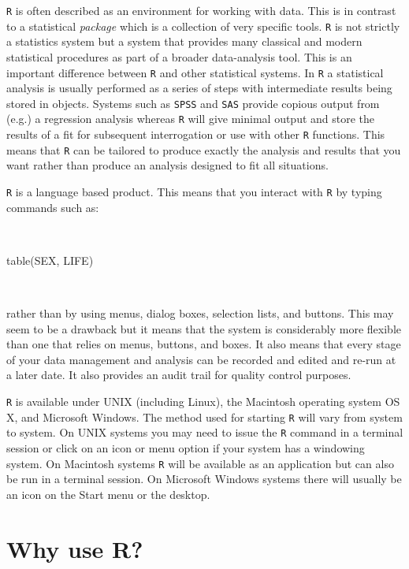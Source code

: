 \documentclass[
  12pt,
]{book}
\newenvironment{Shaded}{\begin{snugshade}}{\end{snugshade}}
\newcommand{\FunctionTok}[1]{\textcolor[rgb]{0.00,0.00,0.00}{#1}}
\newcommand{\NormalTok}[1]{#1}
\begin{document}
\texttt{R} is often described as an environment for working with data. This is in contrast to a statistical \emph{package} which is a collection of very specific tools. \texttt{R} is not strictly a statistics system but a system that provides many classical and modern statistical procedures as part of a broader data-analysis tool. This is an important difference between \texttt{R} and other statistical systems. In \texttt{R} a statistical analysis is usually performed as a series of steps with intermediate results being stored in objects. Systems such as \texttt{SPSS} and \texttt{SAS} provide copious output from (e.g.) a regression analysis whereas \texttt{R} will give minimal output and store the results of a fit for subsequent interrogation or use with other \texttt{R} functions. This means that \texttt{R} can be tailored to produce exactly the analysis and results that you want rather than produce an analysis designed to fit all situations.

\texttt{R} is a language based product. This means that you interact with \texttt{R} by typing commands such as:

~

\begin{Shaded}
\begin{Highlighting}[]
\FunctionTok{table}\NormalTok{(SEX, LIFE)}
\end{Highlighting}
\end{Shaded}

~

rather than by using menus, dialog boxes, selection lists, and buttons. This may seem to be a drawback but it means that the system is considerably more flexible than one that relies on menus, buttons, and boxes. It also means that every stage of your data management and analysis can be recorded and edited and re-run at a later date. It also provides an audit trail for quality control purposes.

\texttt{R} is available under UNIX (including Linux), the Macintosh operating system OS X, and Microsoft Windows. The method used for starting \texttt{R} will vary from system to system. On UNIX systems you may need to issue the \texttt{R} command in a terminal session or click on an icon or menu option if your system has a windowing system. On Macintosh systems \texttt{R} will be available as an application but can also be run in a terminal session. On Microsoft Windows systems there will usually be an icon on the Start menu or the desktop.

\hypertarget{why-r}{%
\section{Why use R?}\label{why-r}}
\end{document}

